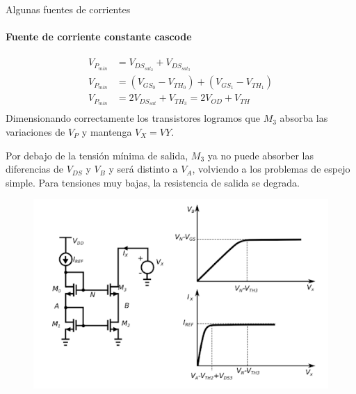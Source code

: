 \documentclass[aspectratio=169, 8pt]{beamer}
\begin{document}
\begin{frame}{Algunas fuentes de corrientes}
\framesubtitle{Fuente de corriente constante cascode}
\begin{align}
	V_{P_{min}} &= V_{DS_{sat_{2}}} + V_{DS_{sat_3}} \\
	V_{P_{min}} &= (V_{GS_0} - V_{TH_0}) + (V_{GS_1} - V_{TH_1}) \\
	V_{P_{min}} &= 2V_{DS_{sat}} + V_{TH_3} = 2V_{OD} + V_{TH} \\
\end{align}
Dimensionando correctamente los transistores logramos que $M_3$
absorba las variaciones de $V_P$ y mantenga $V_X = VY$.\newline

Por debajo de la tensión mínima de salida, $M_3$ ya no puede 
absorber las diferencias de $V_{DS}$ y $V_B$ y será distinto a 
$V_A$, volviendo a los problemas de espejo simple. Para tensiones
muy bajas, la resistencia de salida se degrada.

\begin{figure}
	\includegraphics[scale=0.3]{IMAGENES/image4.png}
\end{figure}
\end{frame}
\end{document}
